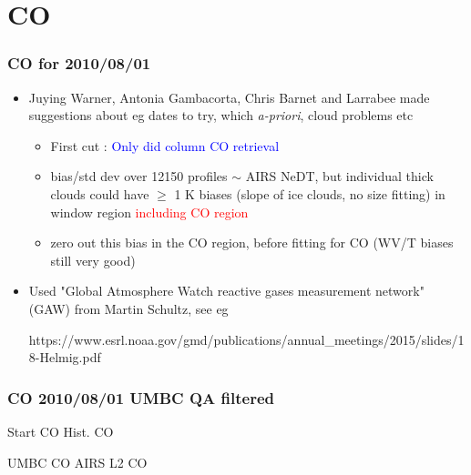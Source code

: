 \documentclass[10pt,t]{beamer}
\begin{document}
\section{CO}
\begin{frame}
  \frametitle{CO for 2010/08/01}
  \begin{itemize}
  \item Juying Warner,  Antonia Gambacorta,  Chris Barnet and Larrabee made suggestions about eg
    dates to try, which \emph{a-priori}, cloud problems etc
    \begin{itemize}
    \item First cut : \textcolor{blue}{Only did column CO retrieval}
    \item bias/std dev over 12150 profiles $\sim$  AIRS NeDT, but individual thick clouds could have
          $\geq$ 1 K biases (slope of ice clouds, no size fitting) in window region \textcolor{red}{including
	  CO region}
    \item zero out this bias in the CO region, before fitting for CO (WV/T biases still very good)
    \end{itemize}
  \item Used "Global Atmosphere Watch reactive gases measurement network"
    (GAW) from Martin Schultz, see eg
    \begin{small} https://www.esrl.noaa.gov/gmd/publications/annual\_meetings/2015/slides/18-Helmig.pdf \end{small}
  \end{itemize}
\end{frame}
\begin{frame}
  \frametitle{CO 2010/08/01 UMBC QA filtered}

\vspace{-0.15in}  
  \footnotesize Start CO  \hspace{2.0in} \footnotesize Hist. CO\\
\vspace{-0.1in}      
  \begin{center}
  \end{center}

\vspace{-0.15in}  
  \footnotesize UMBC CO \hspace{2.0in} \footnotesize AIRS L2 CO\\
\vspace{-0.1in}      
  \begin{center}
  \end{center}

\end{frame}
\end{document}
